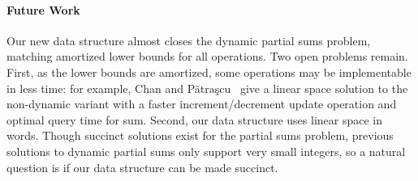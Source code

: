 \paragraph{Future Work}
Our new data structure almost closes the dynamic partial sums problem, matching amortized lower bounds for all operations. Two open problems remain. 
First, as the lower bounds are amortized, some operations may be implementable in less time: for example, Chan and Pătraşcu~\cite{chan2010counting} give a linear space solution to the non-dynamic variant with a faster increment/decrement update operation and optimal query time for sum. 
Second, our data structure uses linear space in words. Though succinct solutions exist for the partial sums problem, previous solutions to dynamic partial sums only support very small integers, so a natural question is if our data structure can be made succinct. 





